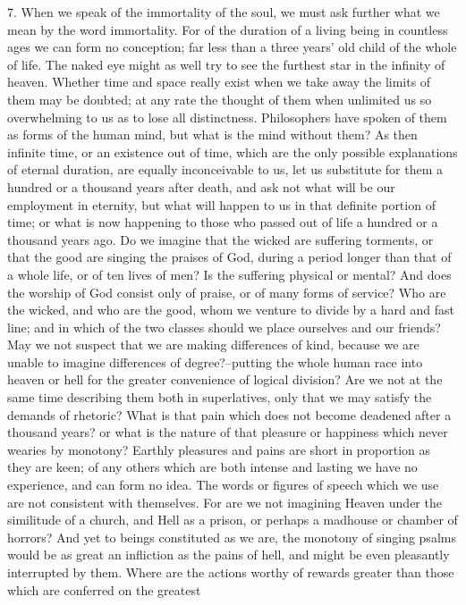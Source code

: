 7. When we speak of the immortality of the soul, we must ask further
what we mean by the word immortality. For of the duration of a living
being in countless ages we can form no conception; far less than a three
years' old child of the whole of life. The naked eye might as well try
to see the furthest star in the infinity of heaven. Whether time and
space really exist when we take away the limits of them may be doubted;
at any rate the thought of them when unlimited us so overwhelming to us
as to lose all distinctness. Philosophers have spoken of them as forms
of the human mind, but what is the mind without them? As then infinite
time, or an existence out of time, which are the only possible
explanations of eternal duration, are equally inconceivable to us, let
us substitute for them a hundred or a thousand years after death, and
ask not what will be our employment in eternity, but what will happen to
us in that definite portion of time; or what is now happening to those
who passed out of life a hundred or a thousand years ago. Do we imagine
that the wicked are suffering torments, or that the good are singing the
praises of God, during a period longer than that of a whole life, or
of ten lives of men? Is the suffering physical or mental? And does the
worship of God consist only of praise, or of many forms of service? Who
are the wicked, and who are the good, whom we venture to divide by a
hard and fast line; and in which of the two classes should we place
ourselves and our friends? May we not suspect that we are making
differences of kind, because we are unable to imagine differences
of degree?--putting the whole human race into heaven or hell for the
greater convenience of logical division? Are we not at the same time
describing them both in superlatives, only that we may satisfy the
demands of rhetoric? What is that pain which does not become deadened
after a thousand years? or what is the nature of that pleasure or
happiness which never wearies by monotony? Earthly pleasures and pains
are short in proportion as they are keen; of any others which are both
intense and lasting we have no experience, and can form no idea.
The words or figures of speech which we use are not consistent with
themselves. For are we not imagining Heaven under the similitude of
a church, and Hell as a prison, or perhaps a madhouse or chamber of
horrors? And yet to beings constituted as we are, the monotony of
singing psalms would be as great an infliction as the pains of hell,
and might be even pleasantly interrupted by them. Where are the actions
worthy of rewards greater than those which are conferred on the greatest

